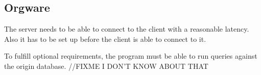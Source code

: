 \subsection{Orgware}

The server needs to be able to connect to the client with a reasonable latency.
Also it has to be set up before the client is able to connect to it.


To fulfill optional requirements, the program must be able to run queries against
the origin database. //FIXME I DON'T KNOW ABOUT THAT

% 
